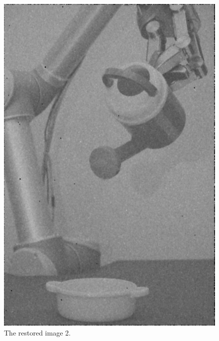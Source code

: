 \begin{figure}[H]
\centering
\includegraphics[width = \fullImageWidth]{../code/images/image_result_2.png}
\caption{The restored image 2.}
\label{fig:image_2_restored}
\end{figure}
